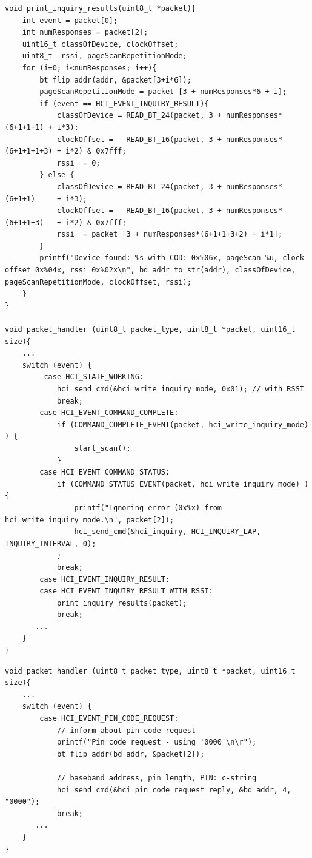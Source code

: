 \begin{lstlisting}[float, caption=Discovering remote Bluetooth devices., label=DiscoverDevices]
void print_inquiry_results(uint8_t *packet){
    int event = packet[0];
    int numResponses = packet[2];
    uint16_t classOfDevice, clockOffset;
    uint8_t  rssi, pageScanRepetitionMode;
    for (i=0; i<numResponses; i++){
        bt_flip_addr(addr, &packet[3+i*6]);
        pageScanRepetitionMode = packet [3 + numResponses*6 + i];
        if (event == HCI_EVENT_INQUIRY_RESULT){
            classOfDevice = READ_BT_24(packet, 3 + numResponses*(6+1+1+1) + i*3);
            clockOffset =   READ_BT_16(packet, 3 + numResponses*(6+1+1+1+3) + i*2) & 0x7fff;
            rssi  = 0;
        } else {
            classOfDevice = READ_BT_24(packet, 3 + numResponses*(6+1+1)     + i*3);
            clockOffset =   READ_BT_16(packet, 3 + numResponses*(6+1+1+3)   + i*2) & 0x7fff;
            rssi  = packet [3 + numResponses*(6+1+1+3+2) + i*1];
        }
        printf("Device found: %s with COD: 0x%06x, pageScan %u, clock offset 0x%04x, rssi 0x%02x\n", bd_addr_to_str(addr), classOfDevice, pageScanRepetitionMode, clockOffset, rssi);
    }
}

void packet_handler (uint8_t packet_type, uint8_t *packet, uint16_t size){
    ...
    switch (event) {
         case HCI_STATE_WORKING:
            hci_send_cmd(&hci_write_inquiry_mode, 0x01); // with RSSI
            break;
        case HCI_EVENT_COMMAND_COMPLETE:
            if (COMMAND_COMPLETE_EVENT(packet, hci_write_inquiry_mode) ) {
                start_scan();
            }
        case HCI_EVENT_COMMAND_STATUS:
            if (COMMAND_STATUS_EVENT(packet, hci_write_inquiry_mode) ) {
                printf("Ignoring error (0x%x) from hci_write_inquiry_mode.\n", packet[2]);
                hci_send_cmd(&hci_inquiry, HCI_INQUIRY_LAP, INQUIRY_INTERVAL, 0);
            }
            break;
        case HCI_EVENT_INQUIRY_RESULT:
        case HCI_EVENT_INQUIRY_RESULT_WITH_RSSI:
            print_inquiry_results(packet);
            break;
       ...
    }
}
\end{lstlisting}

\begin{lstlisting}[caption=Answering authentication request with PIN 0000., label=PinCodeRequest]
void packet_handler (uint8_t packet_type, uint8_t *packet, uint16_t size){
    ...
    switch (event) {
        case HCI_EVENT_PIN_CODE_REQUEST:
            // inform about pin code request
            printf("Pin code request - using '0000'\n\r");
            bt_flip_addr(bd_addr, &packet[2]);
            
            // baseband address, pin length, PIN: c-string
            hci_send_cmd(&hci_pin_code_request_reply, &bd_addr, 4, "0000");
            break;
       ...
    }
}
\end{lstlisting}

